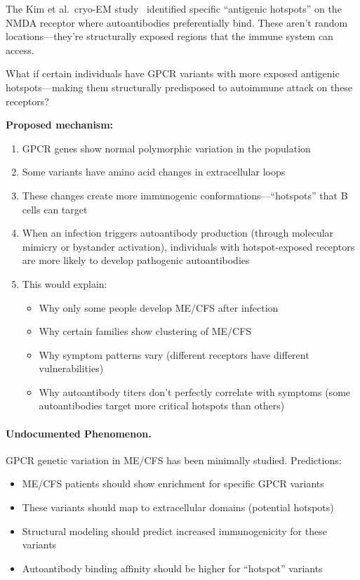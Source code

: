 \begin{open_question}
The Kim et al.\ cryo-EM study~\cite{Kim2026nmdar_cryoem} identified specific ``antigenic hotspots'' on the NMDA receptor where autoantibodies preferentially bind. These aren't random locations---they're structurally exposed regions that the immune system can access.

What if certain individuals have GPCR variants with more exposed antigenic hotspots---making them structurally predisposed to autoimmune attack on these receptors?

\textbf{Proposed mechanism:}
\begin{enumerate}
    \item GPCR genes show normal polymorphic variation in the population
    \item Some variants have amino acid changes in extracellular loops
    \item These changes create more immunogenic conformations---``hotspots'' that B cells can target
    \item When an infection triggers autoantibody production (through molecular mimicry or bystander activation), individuals with hotspot-exposed receptors are more likely to develop pathogenic autoantibodies
    \item This would explain:
    \begin{itemize}
        \item Why only some people develop ME/CFS after infection
        \item Why certain families show clustering of ME/CFS
        \item Why symptom patterns vary (different receptors have different vulnerabilities)
        \item Why autoantibody titers don't perfectly correlate with symptoms (some autoantibodies target more critical hotspots than others)
    \end{itemize}
\end{enumerate}
\end{open_question}

\paragraph{Undocumented Phenomenon.} GPCR genetic variation in ME/CFS has been minimally studied. Predictions:
\begin{itemize}
    \item ME/CFS patients should show enrichment for specific GPCR variants
    \item These variants should map to extracellular domains (potential hotspots)
    \item Structural modeling should predict increased immunogenicity for these variants
    \item Autoantibody binding affinity should be higher for ``hotspot'' variants
\end{itemize}

